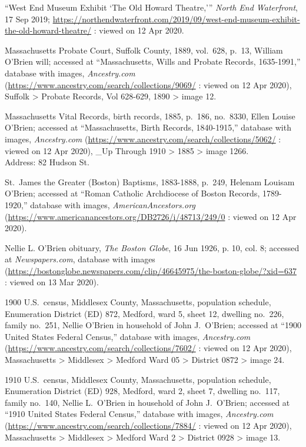 \begin{thebibliography}{999}
	``West End Museum Exhibit `The Old Howard Theatre,''' \textit{North End Waterfront}, 17 Sep 2019;  \url{https://northendwaterfront.com/2019/09/west-end-museum-exhibit-the-old-howard-theatre/} : viewed on 12 Apr 2020.
	
	Massachusetts Probate Court, Suffolk County, 1889, vol.\ 628, p.\ 13, William O'Brien will; accessed at ``Massachusetts, Wills and Probate Records, 1635-1991,'' database with images, \textit{Ancestry.com} (\url{https://www.ancestry.com/search/collections/9069/} : viewed on 12 Apr 2020), Suffolk > Probate Records, Vol 628-629, 1890 > image 12.
	
	Massachusetts Vital Records, birth records, 1885, p.\ 186, no.\ 8330, Ellen Louise O'Brien; accessed at ``Massachusetts, Birth Records, 1840-1915,'' database with images, \textit{Ancestry.com} (\url{https://www.ancestry.com/search/collections/5062/} : viewed on 12 Apr 2020), \_Up Through 1910 > 1885 > image 1266.\\
	Address: 82 Hudson St.
	
	St.\ James the Greater (Boston) Baptisms, 1883-1888, p.\ 249, Helenam Louisam O'Brien; accessed at ``Roman Catholic Archdiocese of Boston Records, 1789-1920,'' database with images, \textit{AmericanAncestors.org} (\url{https://www.americanancestors.org/DB2726/i/48713/249/0} : viewed on 12 Apr 2020).
	
	Nellie L. O’Brien obituary, \textit{The Boston Globe}, 16 Jun 1926, p. 10, col. 8; accessed at \textit{Newspapers.com}, database with images (\url{https://bostonglobe.newspapers.com/clip/46645975/the-boston-globe/?xid=637} : viewed on 13 Mar 2020). 
	
	1900 U.S.\ census, Middlesex County, Massachusetts, population schedule, Enumeration District (ED) 872, Medford, ward 5, sheet 12, dwelling no.\ 226, family no.\ 251, Nellie O'Brien in household of John J.\ O'Brien; accessed at ``1900 United States Federal Census,'' database with images, \textit{Ancestry.com} (\url{https://www.ancestry.com/search/collections/7602/} : viewed on 12 Apr 2020), Massachusetts > Middlesex > Medford Ward 05 > District 0872 > image 24.
	
	1910 U.S.\ census, Middlesex County, Massachusetts, population schedule, Enumeration District (ED) 928, Medford, ward 2, sheet 7, dwelling no.\ 117, family no.\ 140, Nellie L.\ O'Brien in household of John J.\ O'Brien; accessed at ``1910 United States Federal Census,'' database with images, \textit{Ancestry.com} (\url{https://www.ancestry.com/search/collections/7884/} : viewed on 12 Apr 2020), Massachusetts > Middlesex > Medford Ward 2 > District 0928 > image 13.
	

\end{thebibliography}
